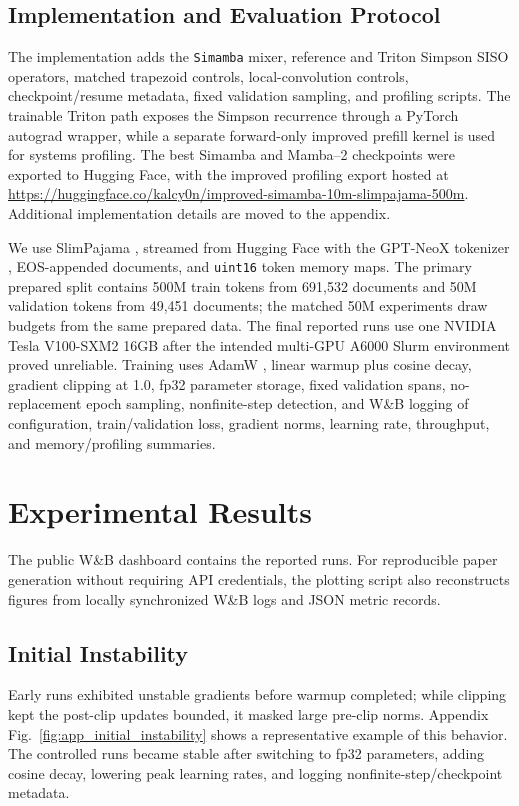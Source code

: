 \documentclass[conference]{IEEEtran}
\newcommand{\modelname}{Simamba\xspace}
\newcommand{\mambatwo}{Mamba--2\xspace}
\begin{document}
\subsection{Implementation and Evaluation Protocol}

The implementation adds the \texttt{Simamba} mixer, reference and Triton Simpson SISO operators, matched trapezoid controls, local-convolution controls, checkpoint/resume metadata, fixed validation sampling, and profiling scripts. The trainable Triton path exposes the Simpson recurrence through a PyTorch autograd wrapper, while a separate forward-only improved prefill kernel is used for systems profiling. The best \modelname and \mambatwo checkpoints were exported to Hugging Face, with the improved profiling export hosted at \url{https://huggingface.co/kalcy0n/improved-simamba-10m-slimpajama-500m}. Additional implementation details are moved to the appendix.

We use SlimPajama \cite{slimpajama}, streamed from Hugging Face with the GPT-NeoX tokenizer \cite{gptneox}, EOS-appended documents, and \texttt{uint16} token memory maps. The primary prepared split contains 500M train tokens from 691,532 documents and 50M validation tokens from 49,451 documents; the matched 50M experiments draw budgets from the same prepared data. The final reported runs use one NVIDIA Tesla V100-SXM2 16GB after the intended multi-GPU A6000 Slurm environment proved unreliable. Training uses AdamW \cite{adamw}, linear warmup plus cosine decay, gradient clipping at 1.0, fp32 parameter storage, fixed validation spans, no-replacement epoch sampling, nonfinite-step detection, and W\&B logging of configuration, train/validation loss, gradient norms, learning rate, throughput, and memory/profiling summaries.

\section{Experimental Results}

The public W\&B dashboard contains the reported runs. For reproducible paper generation without requiring API credentials, the plotting script also reconstructs figures from locally synchronized W\&B logs and JSON metric records.

\subsection{Initial Instability}

Early runs exhibited unstable gradients before warmup completed; while clipping kept the post-clip updates bounded, it masked large pre-clip norms. Appendix Fig.~\ref{fig:app_initial_instability} shows a representative example of this behavior. The controlled runs became stable after switching to fp32 parameters, adding cosine decay, lowering peak learning rates, and logging nonfinite-step/checkpoint metadata.
\end{document}
